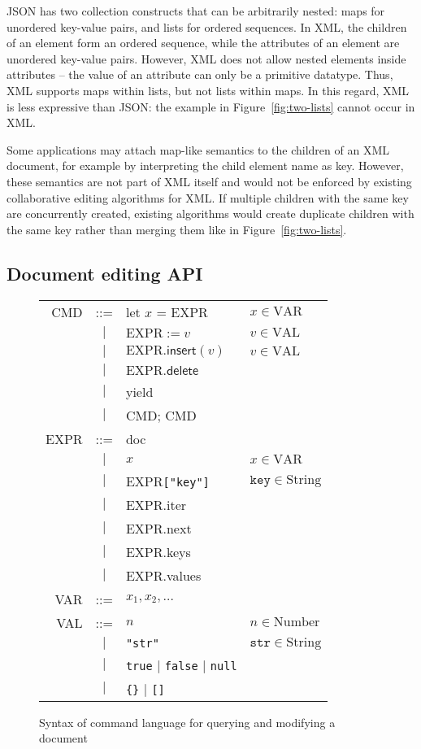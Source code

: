 \documentclass[a4paper,twocolumn,10pt]{article}
\begin{document}
JSON has two collection constructs that can be arbitrarily nested: maps for unordered key-value pairs, and lists for ordered sequences. In XML, the children of an element form an ordered sequence, while the attributes of an element are unordered key-value pairs. However, XML does not allow nested elements inside attributes -- the value of an attribute can only be a primitive datatype. Thus, XML supports maps within lists, but not lists within maps. In this regard, XML is less expressive than JSON: the example in Figure~\ref{fig:two-lists} cannot occur in XML.

Some applications may attach map-like semantics to the children of an XML document, for example by interpreting the child element name as key. However, these semantics are not part of XML itself and would not be enforced by existing collaborative editing algorithms for XML. If multiple children with the same key are concurrently created, existing algorithms would create duplicate children with the same key rather than merging them like in Figure~\ref{fig:two-lists}.

\subsection{Document editing API}

\begin{figure}
\centering
\begin{tabular}{rcll}
CMD & ::= & \textsf{let} $x$ = EXPR & $x \in \mathrm{VAR}$ \\
& $|$ & $\mathrm{EXPR} := v$ & $v \in \mathrm{VAL}$ \\
& $|$ & $\mathrm{EXPR}.\mathsf{insert}(v)$ & $v \in \mathrm{VAL}$ \\
& $|$ & $\mathrm{EXPR}.\mathsf{delete}$ \\
& $|$ & \textsf{yield} \\
& $|$ & CMD; CMD \vspace{0.5em}\\
EXPR & ::= & \textsf{doc} \\
& $|$ & $x$ & $x \in \mathrm{VAR}$ \\
& $|$ & EXPR\verb|["key"]| & $\mathtt{key} \in \mathrm{String}$ \\
& $|$ & EXPR.\textsf{iter} \\
& $|$ & EXPR.\textsf{next} \\
& $|$ & EXPR.\textsf{keys} \\
& $|$ & EXPR.\textsf{values} \vspace{0.5em}\\
VAR & ::= & ${x_1, x_2, \dots}$ \vspace{0.5em}\\
VAL & ::= & $n$ & $n \in \mathrm{Number}$ \\
& $|$ & \verb|"str"| & $\mathtt{str} \in \mathrm{String}$ \\
& $|$ & \verb|true| $|$ \verb|false| $|$ \verb|null| \\
& $|$ & \verb|{}| $|$ \verb|[]|
\end{tabular}
\caption{Syntax of command language for querying and modifying a document}\label{fig:local-syntax}
\end{figure}
\end{document}
